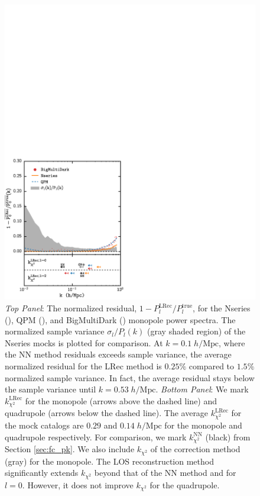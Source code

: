 \begin{figure}
\begin{center}
\includegraphics[scale=0.4]{figs/fc/mock_catalog_dlospeak_true_P0k_norm_resid_rebin6x.pdf} 
\caption{{\it Top Panel}: The normalized residual, 
$1 - P_l^\mathrm{LRec}/P_l^\mathrm{true}$, 
for the Nseries (\nseriescolor), QPM (\qpmcolor), and BigMultiDark (\bmdcolor)
monopole power spectra. The normalized sample variance $\sigma_l / P_l(k)$ 
(gray shaded region) of the Nseries mocks is plotted for comparison. At 
$k = 0.1 \;h/\mathrm{Mpc}$, where the NN method residuals exceeds sample 
variance, the average normalized residual for the LRec method is $0.25\%$ 
compared to $1.5\%$ normalized sample variance. In fact, the average 
residual stays below the sample variance until $k = 0.53\;h/\mathrm{Mpc}$.
{\it Bottom Panel}: We mark $k^\mathrm{LRec}_{\chi^2}$ for the monopole (arrows above the 
dashed line) and quadrupole (arrows below the dashed line). 
The average $k^\mathrm{LRec}_{\chi^2}$ for the mock catalogs
are $0.29$ and $0.14\;h/\mathrm{Mpc}$ for the monopole and quadrupole respectively. 
For comparison, we mark $k^\mathrm{NN}_{\chi^2}$ (black) from Section \ref{sec:fc_pk}. 
We also include $k_{\chi^2}$ of the \cite{Gil-Marin:2014aa} correction method (gray) for 
the monopole. The LOS reconstruction method significantly 
extends $k_{\chi^2}$ beyond that of the NN method and \cite{Gil-Marin:2014aa} for $l=0$. 
However, it does not improve $k_{\chi^2}$ for the quadrupole. 
} 
\label{fig:dlospeak_norm_resid}
\end{center}
\end{figure}
